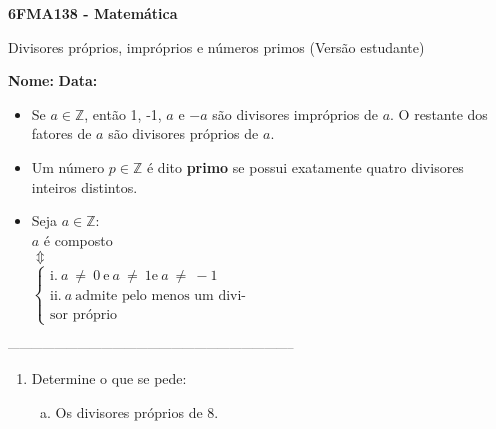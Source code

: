\documentclass[a4paper,14pt]{article}
\begin{document}
	
	\noindent\textbf{6FMA138 - Matemática} 
	
	\begin{center}Divisores próprios, impróprios e números primos (Versão estudante)
	\end{center}
	
	\noindent\textbf{Nome:} \underline{\hspace{10cm}}
	\noindent\textbf{Data:} \underline{\hspace{4cm}}
	
	
	\begin{multicols}{2}
	    \noindent 
	    \begin{itemize}
	    	\item Se $a \in \mathbb{Z}$, então 1, -1, $a$ e $-a$ são divisores impróprios de $a$. O restante dos fatores de $a$ são divisores próprios de $a$.
	    	\item Um número $p \in \mathbb{Z}$ é dito \textbf{primo} se possui exatamente quatro divisores inteiros distintos.
	    	\item Seja $a \in \mathbb{Z}$: \\
	    	\centering $a$ é composto \\
	    	$\Updownarrow$ \\
	    	$\begin{cases}
	    		\text{i.}~a~\neq~0~ \text{e}~a~\neq~1 \text{e}~a~\neq~-1 \\
	    		\text{ii.}~a~\text{admite pelo menos um divi-} \\
	    		\text{sor próprio}
	    	\end{cases}$
	    \end{itemize}
		\noindent\textsubscript{--------------------------------------------------------------------------}
		\begin{enumerate} 
			\item Determine o que se pede:
			\begin{enumerate}[a)]
				\item Os divisores próprios de 8. \\\\\\\\\\\\\\\\

\end{enumerate}
\end{enumerate}
\end{multicols}
\end{document}
